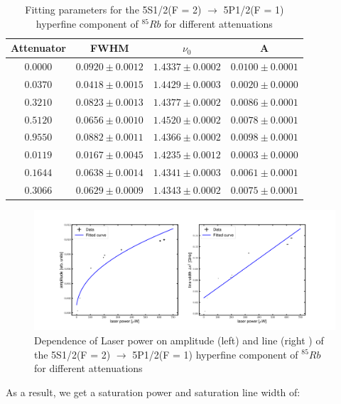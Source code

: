 \documentclass[12pt]{article}
\begin{document}
\begin{table}[H]
    \centering
    \begin{tabular}{c|ccc}
Attenuator & FWHM &  $\nu_0$ & A   \\
\hline
$0.0000$ & $0.0920 \pm 0.0012$& $1.4337 \pm 0.0002$& $0.0100 \pm 0.0001$ \\
$0.0370$ & $0.0418 \pm 0.0015$& $1.4429 \pm 0.0003$& $0.0020 \pm 0.0000$ \\ 
$0.3210$ & $0.0823 \pm 0.0013$& $1.4377 \pm 0.0002$& $0.0086 \pm 0.0001$ \\ 
$0.5120$ & $0.0656 \pm 0.0010$& $1.4520 \pm 0.0002$& $0.0078 \pm 0.0001$ \\ 
$0.9550$ & $0.0882 \pm 0.0011$& $1.4366 \pm 0.0002$& $0.0098 \pm 0.0001$ \\ 
$0.0119$ & $0.0167 \pm 0.0045$& $1.4235 \pm 0.0012$& $0.0003 \pm 0.0000$ \\ 
$0.1644$ & $0.0638 \pm 0.0014$& $1.4341 \pm 0.0003$& $0.0061 \pm 0.0001$ \\ 
$0.3066$ & $0.0629 \pm 0.0009$& $1.4343 \pm 0.0002$& $0.0075 \pm 0.0001$   
    \end{tabular}
    \caption{Fitting parameters for the 5S1/2(F = 2) $\xrightarrow{}$ 5P1/2(F = 1) hyperfine component of $^{85}Rb$ for different attenuations}
    \label{tab7}
\end{table}

\begin{figure}[H]
    \centering
    \includegraphics[width = \textwidth]{fig/saturation-power.png}
    \caption{Dependence of Laser power on amplitude (left) and line (right ) of the 5S1/2(F = 2) $\xrightarrow{}$ 5P1/2(F = 1) hyperfine component of $^{85}Rb$ for different attenuations}
    \label{fig15}
\end{figure}

As a result, we get a saturation power and saturation line width of:
\end{document}
